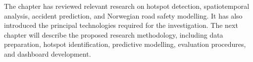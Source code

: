 The chapter has reviewed relevant research on hotspot detection, spatiotemporal analysis, accident prediction, and Norwegian road safety modelling. It has also introduced the principal technologies required for the investigation. The next chapter will describe the proposed research methodology, including data preparation, hotspot identification, predictive modelling, evaluation procedures, and dashboard development.

